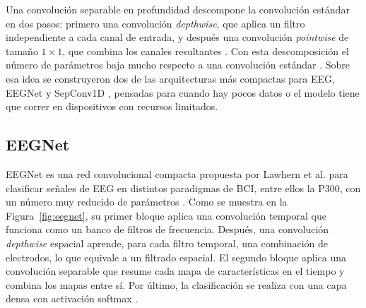 Una convolución separable en profundidad descompone la convolución estándar en dos pasos: primero
una convolución \textit{depthwise}, que aplica un filtro independiente a cada canal de entrada, y
después una convolución \textit{pointwise} de tamaño $1\times1$, que combina los canales
resultantes \cite{chollet2017}. Con esta descomposición el número de parámetros baja mucho
respecto a una convolución estándar \cite{chollet2017}. Sobre esa idea se construyeron dos de las
arquitecturas más compactas para EEG, EEGNet \cite{lawhern2018} y SepConv1D \cite{alvarado2021},
pensadas para cuando hay pocos datos o el modelo tiene que correr en dispositivos con recursos
limitados.

\subsection{EEGNet}

EEGNet es una red convolucional compacta propuesta por Lawhern et al. para clasificar señales de
EEG en distintos paradigmas de BCI, entre ellos la P300, con un número muy reducido de parámetros
\cite{lawhern2018}. Como se muestra en la Figura~\ref{fig:eegnet}, su primer bloque aplica una
convolución temporal que funciona como un banco de filtros de frecuencia. Después, una convolución
\textit{depthwise} espacial aprende, para cada filtro temporal, una combinación de electrodos, lo
que equivale a un filtrado espacial. El segundo bloque aplica una convolución separable que resume
cada mapa de características en el tiempo y combina los mapas entre sí. Por último, la
clasificación se realiza con una capa densa con activación softmax \cite{lawhern2018}.

